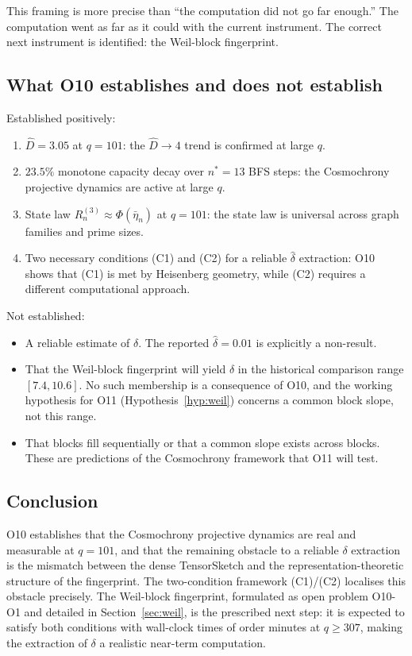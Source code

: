 \documentclass[11pt,a4paper]{article}
\newcommand{\Dhat}{\hat{D}}
\newcommand{\delt}{\hat{\delta}}
\begin{document}
    This framing is more precise than ``the computation did not go far enough.''
    The computation went as far as it could with the current instrument.
    The correct next instrument is identified: the Weil-block fingerprint.

  \subsection{What O10 establishes and does not establish}

    Established positively:
    \begin{enumerate}
      \item $\Dhat = 3.05$ at $q = 101$: the $\Dhat \to 4$ trend is confirmed
      at large $q$.
      \item $23.5\%$ monotone capacity decay over $n^* = 13$ BFS steps: the
      Cosmochrony projective dynamics are active at large $q$.
      \item State law $R_n^{(3)} \approx \Phi(\bar\eta_n)$ at $q = 101$:
      the state law is universal across graph families and prime sizes.
      \item Two necessary conditions (C1) and (C2) for a reliable $\delt$
      extraction: O10 shows that (C1) is met by Heisenberg geometry, while
      (C2) requires a different computational approach.
    \end{enumerate}

    Not established:
    \begin{itemize}
      \item A reliable estimate of $\delta$.
      The reported $\delt = 0.01$ is explicitly a non-result.
      \item That the Weil-block fingerprint will yield $\delta$ in the historical comparison range $[7.4, 10.6]$.
      No such membership is a consequence of O10, and the working hypothesis for O11
      (Hypothesis~\ref{hyp:weil}) concerns a common block slope, not this range.
      \item That blocks fill sequentially or that a common slope exists across
      blocks.
      These are predictions of the Cosmochrony framework that O11 will test.
    \end{itemize}

  \subsection{Conclusion}

    O10 establishes that the Cosmochrony projective dynamics are real and
    measurable at $q = 101$, and that the remaining obstacle to a reliable
    $\delta$ extraction is the mismatch between the dense TensorSketch and
    the representation-theoretic structure of the fingerprint.
    The two-condition framework (C1)/(C2) localises this obstacle precisely.
    The Weil-block fingerprint, formulated as open problem O10-O1 and
    detailed in Section~\ref{sec:weil}, is the prescribed next step:
    it is expected to satisfy both conditions with wall-clock times of
    order minutes at $q \geq 307$, making the extraction of $\delta$
    a realistic near-term computation.

    
      
\end{document}
